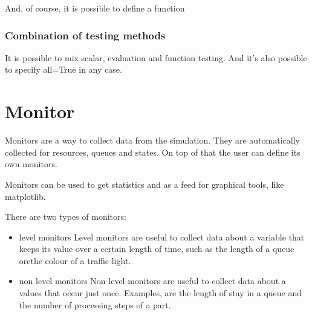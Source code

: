 \documentclass[letterpaper,10pt,english]{sphinxmanual}
\begin{document}
And, of course, it is possible to define a function

%
\begin{sphinxVerbatim}[commandchars=\\\{\}]
 
        
       


  
  
\end{sphinxVerbatim}


\subsection{Combination of testing methods}
\label{\detokenize{State:combination-of-testing-methods}}
It is possible to mix scalar, evaluation and function testing. And it’s also possible to specify all=True
in any case.


\chapter{Monitor}
\label{\detokenize{Monitor:monitor}}\label{\detokenize{Monitor::doc}}
Monitors are a way to collect data from the simulation. They are automatically collected
for resources, queues and states. On top of that the user can define its own monitors.

Monitors can be used to get statistics and as a feed for graphical tools, like matplotlib.

There are two types of monitors:
\begin{itemize}
\item {} 
level monitors
Level monitors are useful to collect data about a variable that keeps its value over a certain length
of time, such as the length of a queue orcthe colour of a traffic light.

\item {} 
non level monitors
Non level monitors are useful to collect data about a values that occur just once. Examples, are the length of stay in a queue and
the number of processing steps of a part.

\end{itemize}
\end{document}
